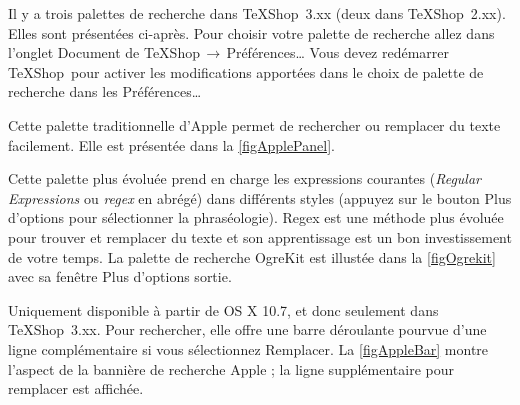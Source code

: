 \documentclass[11pt,french]{article}
\newcommand{\TS}{\textsf{\TeX Shop}}
\newcommand{\acr}[1]{\textsf{#1}}
\newcommand{\cmd}[1]{\textsf{#1}}
\newcommand{\mnu}[1]{\textsf{#1}}
\newcommand{\To}{\,\(\to\)\,}
\begin{document}
Il y a trois palettes de recherche dans \TS\ 3.xx (deux dans \TS\ 2.xx). Elles sont présentées ci-après. Pour choisir votre palette de recherche allez dans l'onglet \mnu{Document} de \mnu{TeXShop}\To\mnu{Préférences…} Vous devez redémarrer \TS\ pour activer les modifications apportées dans le choix de palette de recherche dans les \mnu{Préférences…}
\begin{description}[leftmargin=\parindent]
\item[Palette de recherche Apple]
Cette palette traditionnelle d'Apple permet de rechercher ou remplacer du texte facilement. Elle est présentée dans la \vref{figApplePanel}. %
\item[Palette de recherche OgreKit]
Cette palette plus évoluée prend en charge les expressions courantes (\emph{Regular Expressions} ou \emph{\acr{regex}} en abrégé) dans différents styles (appuyez sur le bouton \mnu{Plus d'options} pour sélectionner la phraséologie). \acr{Regex} est une méthode plus évoluée pour trouver et remplacer du texte et son apprentissage est un bon investissement de votre temps. La palette de recherche OgreKit est illustée dans la \vref{figOgrekit} avec sa fenêtre \cmd{Plus d'options} sortie.
\item[Bannière de recherche Apple]
Uniquement disponible à partir de \cmd{OS X 10.7}, et donc seulement dans \acr{\TS\ 3.xx}. Pour rechercher, elle offre une barre déroulante pourvue d'une ligne complémentaire si vous sélectionnez \mnu{Remplacer}. La \vref{figAppleBar} montre l'aspect de la bannière de recherche Apple ; la ligne supplémentaire pour remplacer est affichée.
\end{description}
\end{document}

